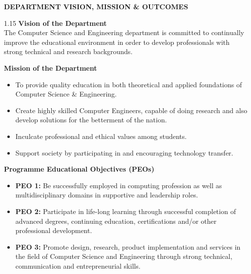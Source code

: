 \thispagestyle{empty}

\begin{center}
{\Large \textbf{DEPARTMENT VISION, MISSION \& OUTCOMES}}\\[0.4cm]
\end{center}

\begin{spacing}{1.15}
\noindent \textbf{\large Vision of the Department}\\[0.1cm]
The Computer Science and Engineering department is committed to continually improve the educational environment in order to develop professionals with strong technical and research backgrounds.

\vspace{0.3cm}
\noindent \textbf{\large Mission of the Department}\\[0.1cm]
\begin{itemize}
\setlength\itemsep{0.05em}
\item To provide quality education in both theoretical and applied foundations of Computer Science \& Engineering.
\item Create highly skilled Computer Engineers, capable of doing research and also develop solutions for the betterment of the nation.
\item Inculcate professional and ethical values among students.
\item Support society by participating in and encouraging technology transfer.
\end{itemize}

\vspace{0.3cm}
\noindent \textbf{\large Programme Educational Objectives (PEOs)}\\[0.1cm]
\begin{itemize}
\setlength\itemsep{0.05em}
\item \textbf{PEO 1:} Be successfully employed in computing profession as well as multidisciplinary domains in supportive and leadership roles.
\item \textbf{PEO 2:} Participate in life-long learning through successful completion of advanced degrees, continuing education, certifications and/or other professional development.
\item \textbf{PEO 3:} Promote design, research, product implementation and services in the field of Computer Science and Engineering through strong technical, communication and entrepreneurial skills.
\end{itemize}


\end{spacing}
